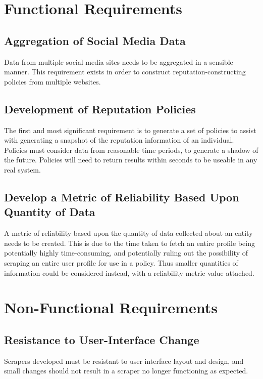\section{Functional Requirements}

\subsection{Aggregation of Social Media Data}

Data from multiple social media sites needs to be aggregated in a sensible manner. This requirement exists in order to construct reputation-constructing policies from multiple websites. 

\subsection{Development of Reputation Policies}

The first and most significant requirement is to generate a set of policies to assist with generating a snapshot of the reputation information of an individual. Policies must consider data from reasonable time periods, to generate a shadow of the future. Policies will need to return results within seconds to be useable in any real system. 

\subsection{Develop a Metric of Reliability Based Upon Quantity of Data}

A metric of reliability based upon the quantity of data collected about an entity needs to be created. This is due to the time taken to fetch an entire profile being potentially highly time-consuming, and potentially ruling out the possibility of scraping an entire user profile for use in a policy. Thus smaller quantities of information could be considered instead, with a reliability metric value attached. 

\section{Non-Functional Requirements}

\subsection{Resistance to User-Interface Change}

Scrapers developed must be resistant to user interface layout and design, and small changes should not result in a scraper no longer functioning as expected. 

